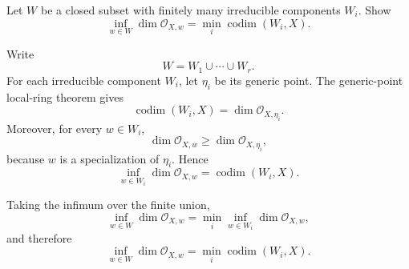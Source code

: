 \begin{problem}\label{prob:vi31-15}
Let \(W\) be a closed subset with finitely many irreducible components \(W_i\). Show
\[
\inf_{w\in W}\dim\mathcal O_{X,w}
=
\min_i\operatorname{codim}(W_i,X).
\]
\end{problem}

\ifdefined\FullProblemDossiers
\begin{solution}
Write
\[
W=W_1\cup\cdots\cup W_r.
\]
For each irreducible component \(W_i\), let \(\eta_i\) be its generic point. The generic-point local-ring theorem
gives
\[
\operatorname{codim}(W_i,X)=\dim\mathcal O_{X,\eta_i}.
\]
Moreover, for every \(w\in W_i\),
\[
\dim\mathcal O_{X,w}\ge\dim\mathcal O_{X,\eta_i},
\]
because \(w\) is a specialization of \(\eta_i\). Hence
\[
\inf_{w\in W_i}\dim\mathcal O_{X,w}
=
\operatorname{codim}(W_i,X).
\]

Taking the infimum over the finite union,
\[
\inf_{w\in W}\dim\mathcal O_{X,w}
=
\min_i
\inf_{w\in W_i}\dim\mathcal O_{X,w},
\]
and therefore
\[
\boxed{
\inf_{w\in W}\dim\mathcal O_{X,w}
=
\min_i\operatorname{codim}(W_i,X).
}
\]
\end{solution}
\fi
